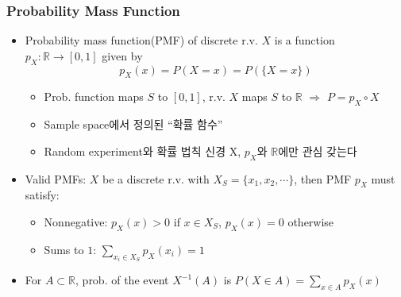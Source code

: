 \subsubsection*{Probability Mass Function}
\begin{itemize}
    \item Probability mass function(PMF) of discrete r.v. $X$ is a function $p_X:\mathbb{R}\to[0,1]$ given by
    \begin{equation}
        p_X(x)=P(X=x)=P(\{X=x\})
    \end{equation}
    \begin{itemize}
        \item Prob. function maps $S$ to $[0,1]$, r.v. $X$ maps $S$ to $\mathbb{R}$ $\Rightarrow$ $P=p_X\circ X$
        \item Sample space에서 정의된 ``확률 함수''
        \item Random experiment와 확률 법칙 신경 X, $p_X$와 $\mathbb{R}$에만 관심 갖는다
    \end{itemize}
    \item Valid PMFs: $X$ be a discrete r.v. with $X_S=\{x_1,x_2,\cdots\}$, then PMF $p_X$ must satisfy:
    \begin{itemize}
        \item Nonnegative: $p_X(x)>0$ if $x\in X_S$, $p_X(x)=0$ otherwise
        \item Sums to $1$: $\sum_{x_i\in X_S}p_X(x_i)=1$
    \end{itemize}
    \item For $A\subset\mathbb{R}$, prob. of the event $X^{-1}(A)$ is $P(X\in A)=\sum_{x\in A}p_X(x)$
\end{itemize}

